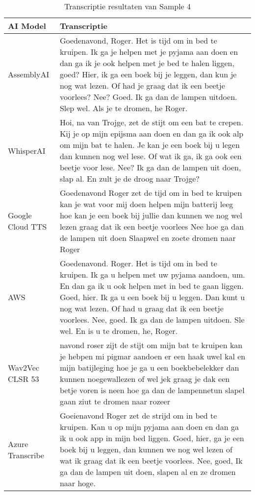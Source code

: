 \begin{table}[htbp]
    \centering
    \caption{Transcriptie resultaten van Sample 4}
    \label{tab:results_sample4}
    \begin{tabularx}{\textwidth}{|l|X|}
        \hline
        \textbf{AI Model} & \textbf{Transcriptie} \\
 \hline
 AssemblyAI &  Goedenavond, Roger. Het is tijd om in bed te kruipen. Ik ga je helpen met je pyjama aan doen en dan ga ik je ook helpen met je bed te halen liggen, goed? Hier, ik ga een boek bij je leggen, dan kun je nog wat lezen. Of had je graag dat ik een beetje voorlees? Nee? Goed. Ik ga dan de lampen uitdoen. Slep wel. Als je te dromen, he Roger.
 

\\ \hline

WhisperAI &    Hoi, na van Trojge, zet de stijt om een bat te crepen. Kij je op mijn epijsma aan doen en dan ga ik ook alp om mijn bat te halen. Je kan je een boek bij u legen dan kunnen nog wel lese. Of wat ik ga, ik ga ook een beetje voor lese. Nee? Ik ga dan de lampen uit doen, slap al. En zult je de droog naar Trojge?


\\ \hline

Google Cloud TTS &   Goedenavond Roger zet de tijd om in bed te kruipen kan je wat voor mij doen helpen mijn batterij leeg hoe kan je een boek bij jullie dan kunnen we nog wel lezen graag dat ik een beetje voorlees Nee hoe ga dan de lampen uit doen Slaapwel en zoete dromen naar Roger


\\ \hline

AWS &   Goedenavond. Roger. Het is tijd om in bed te kruipen. Ik ga u helpen met uw pyjama aandoen, um. En dan ga ik u ook helpen met in bed te gaan liggen. Goed, hier. Ik ga u een boek bij u leggen. Dan kunt u nog wat lezen. Of had u graag dat ik een beetje voorlees. Nee, goed. Ik ga dan de lampen uitdoen. Sle wel. En is u te dromen, he, Roger.


\\ \hline

Wav2Vec CLSR 53 &  navond roser zijt de stijt om mijn bat te kruipen kan je hebpen mi pigmar aandoen er een haak uwel kal en mijn batijleging hoe je ga u een boekbebelekker dan kunnen noegewallezen of wel jek graag je dak een betje voren is neen hoe ga dan de lampennetun slapel gaan ziut te dromen naar rozeer

\\ \hline

Azure Transcribe &  Goeienavond Roger zet de strijd om in bed te kruipen. Kan u op mijn pyjama aan doen en dan ga ik u ook app in mijn bed liggen. Goed, hier, ga je een boek bij u leggen, dan kunnen we nog wel lezen of wat ik graag dat ik een beetje voorlees. Nee, goed, Ik ga dan de lampen uit doen, slapen al en ze dromen naar hoge.
\\ \hline  
    \end{tabularx}
\end{table}
\FloatBarrier
